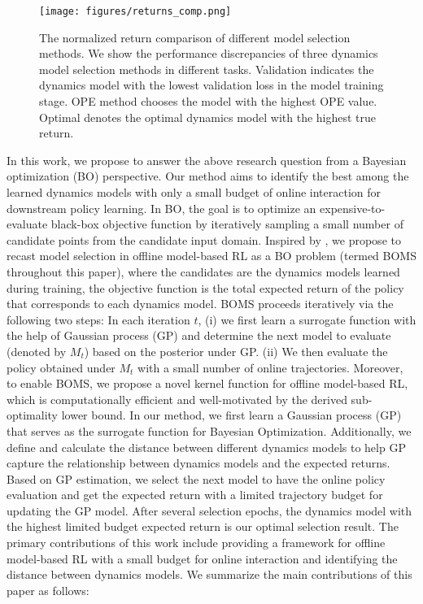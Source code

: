 \begin{figure}
    \centering
    \texttt{[image: figures/returns\_comp.png]}
    \caption{The normalized return comparison of different model selection methods. We show the performance discrepancies of three dynamics model selection methods in different tasks. Validation indicates the dynamics model with the lowest validation loss in the model training stage. OPE method chooses the model with the highest OPE value. Optimal denotes the optimal dynamics model with the highest true return.}
    \label{fig:return_comp}
\end{figure}
In this work, we propose to answer the above research question from a Bayesian optimization (BO) perspective. Our method aims to identify the best among the learned dynamics models with only a small budget of online interaction for downstream policy learning. In BO, the goal is to optimize an expensive-to-evaluate black-box objective function by iteratively sampling a small number of candidate points from the candidate input domain. Inspired by \cite{konyushova2021active}, we propose to recast model selection in offline model-based RL as a BO problem (termed BOMS throughout this paper), where the candidates are the dynamics models learned during training, the objective function is the total expected return of the policy that corresponds to each dynamics model. BOMS proceeds iteratively via the following two steps: In each iteration $t$, (i) we first learn a surrogate function with the help of Gaussian process (GP) and determine the next model to evaluate (denoted by $M_t$) based on the posterior under GP. (ii) We then evaluate the policy obtained under $M_t$ with a small number of online trajectories. Moreover, to enable BOMS, we propose a novel kernel function for offline model-based RL, which is computationally efficient and well-motivated by the derived sub-optimality lower bound. In our method, we first learn a Gaussian process (GP) that serves as the surrogate function for Bayesian Optimization. Additionally, we define and calculate the distance between different dynamics models to help GP capture the relationship between dynamics models and the expected returns. Based on GP estimation, we select the next model to have the online policy evaluation and get the expected return with a limited trajectory budget for updating the GP model. After several selection epochs, the dynamics model with the highest limited budget expected return is our optimal selection result. The primary contributions of this work include providing a framework for offline model-based RL with a small budget for online interaction and identifying the distance between dynamics models. We summarize the main contributions of this paper as follows:
